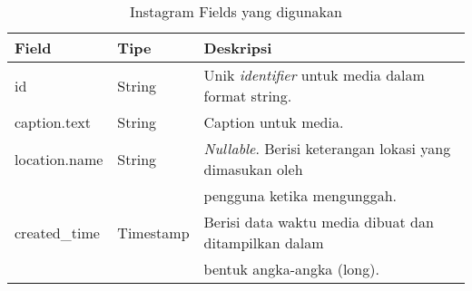 \begin{table}[H]
	\centering
	\begin{tabular}{| l | l | l |}
		\hline
		Field & Tipe & Deskripsi \\
	 	\hline
	 	id & String & Unik \textit{identifier} untuk media dalam format string. \\
	 	caption.text & String & Caption untuk media. \\
	 	location.name & String &  \textit{Nullable}. Berisi keterangan lokasi yang dimasukan oleh \\
	 	& & pengguna ketika mengunggah. \\
	 	created\_time & Timestamp & Berisi data waktu media dibuat dan ditampilkan dalam \\
	 	& & bentuk angka-angka (long).\\
		\hline
	\end{tabular}	
	\caption{Instagram Fields yang digunakan}\label{tab:instagram_fields}
\end{table}	

